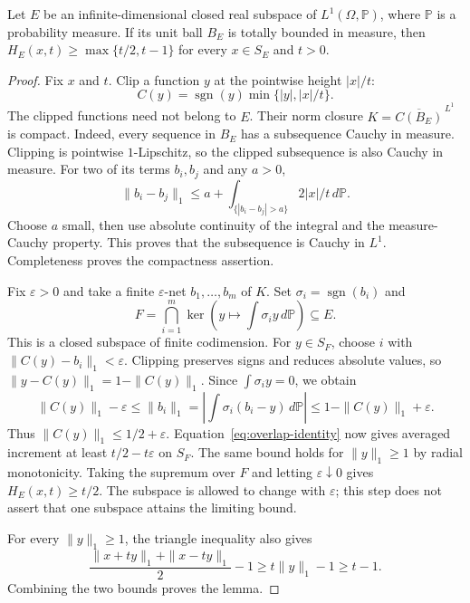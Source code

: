 \begin{lemma}\label{lem:clips}
Let $E$ be an infinite-dimensional closed real subspace of
$L^1(\Omega,\mathbb P)$, where $\mathbb P$ is a probability measure.
If its unit ball $B_E$ is totally bounded in measure, then
$H_E(x,t)\ge\max\{t/2,t-1\}$ for every $x\in S_E$ and $t>0$.
\end{lemma}
\begin{proof}
Fix $x$ and $t$.  Clip a function $y$ at the pointwise height $|x|/t$:
\[
 C(y)=\operatorname{sgn}(y)\min\{|y|,|x|/t\}.
\]
The clipped functions need not belong to $E$.  Their norm closure
$K=\overline{C(B_E)}^{\,L^1}$ is compact.  Indeed, every sequence in $B_E$
has a subsequence Cauchy in measure.  Clipping is pointwise
$1$-Lipschitz, so the clipped subsequence is also Cauchy in measure.
For two of its terms $b_i,b_j$ and any $a>0$,
\[
 \|b_i-b_j\|_1
 \le a+\int_{\{|b_i-b_j|>a\}}2|x|/t\,d\mathbb P.
\]
Choose $a$ small, then use absolute continuity of the integral and the
measure-Cauchy property.  This proves that the subsequence is Cauchy in
$L^1$.  Completeness proves the compactness assertion.

Fix $\varepsilon>0$ and take a finite $\varepsilon$-net
$b_1,\ldots,b_m$ of $K$.  Set $\sigma_i=\operatorname{sgn}(b_i)$ and
\[
 F=\bigcap_{i=1}^m\ker\left(y\longmapsto
                 \int\sigma_i y\,d\mathbb P\right)\subseteq E.
\]
This is a closed subspace of finite codimension.  For $y\in S_F$, choose
$i$ with $\|C(y)-b_i\|_1<\varepsilon$.  Clipping preserves signs and
reduces absolute values, so
$\|y-C(y)\|_1=1-\|C(y)\|_1$.  Since $\int\sigma_i y=0$, we obtain
\[
 \|C(y)\|_1-\varepsilon
 \le\|b_i\|_1
 =\left|\int\sigma_i(b_i-y)\,d\mathbb P\right|
 \le1-\|C(y)\|_1+\varepsilon.
\]
Thus $\|C(y)\|_1\le1/2+\varepsilon$.
Equation~\eqref{eq:overlap-identity} now gives averaged increment at
least $t/2-t\varepsilon$ on $S_F$.  The same bound holds for
$\|y\|_1\ge1$ by radial monotonicity.  Taking the supremum over $F$ and
letting $\varepsilon\downarrow0$ gives $H_E(x,t)\ge t/2$.
The subspace is allowed to change with $\varepsilon$; this step does not
assert that one subspace attains the limiting bound.

For every $\|y\|_1\ge1$, the triangle inequality also gives
\[
 \frac{\|x+ty\|_1+\|x-ty\|_1}{2}-1\ge t\|y\|_1-1\ge t-1.
\]
Combining the two bounds proves the lemma.
\end{proof}

